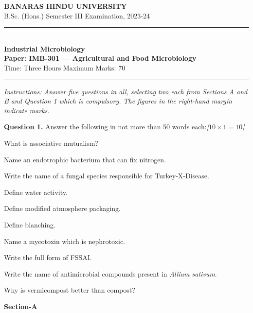 \documentclass[11pt,a4paper]{article}
\newcommand{\pts}[1]{\hfill   \textit{[#1]}}
\begin{document}
\begin{center}
  {\large\bfseries BANARAS HINDU UNIVERSITY}\\[2pt]
  {\normalsize B.Sc. (Hons.) Semester III Examination, 2023-24}\\[6pt]
  \rule{0.8\linewidth}{0.5pt}\\[6pt]
  {\large\bfseries Industrial Microbiology}\\[4pt]
  {\large\bfseries Paper: IMB-301 --- Agricultural and Food Microbiology}\\[4pt]
  {\normalsize Time: Three Hours \hfill Maximum Marks: 70}
\end{center}

\rule{\linewidth}{0.4pt}

\smallskip



\noindent   \textit{Instructions: Answer five questions in all, selecting two each from Sections A and B and Question 1 which is compulsory. The figures in the right-hand margin indicate marks.}

\bigskip

\medskip


\noindent   \textbf{Question 1.} Answer the following in not more than 50 words each:\pts{$10  \times 1 = 10$}

\begin{parts}
  \item What is associative mutualism?
  \item Name an endotrophic bacterium that can fix nitrogen.
  \item Write the name of a fungal species responsible for Turkey-X-Disease.
  \item Define water activity.
  \item Define modified atmosphere packaging.
  \item Define blanching.
  \item Name a mycotoxin which is nephrotoxic.
  \item Write the full form of FSSAI.
  \item Write the name of antimicrobial compounds present in   \textit{Allium sativum}.
  \item Why is vermicompost better than compost?
\end{parts}

\bigskip

\begin{center}
   \textbf{Section-A}
\end{center}
\medskip
\end{document}
